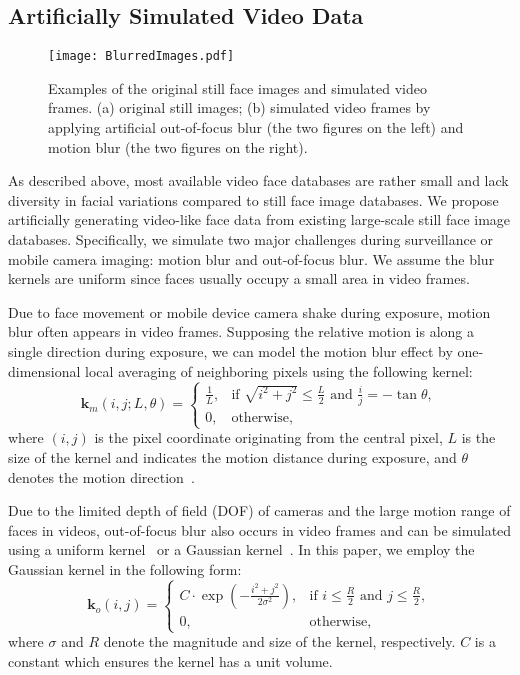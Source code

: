 \documentclass[10pt,journal,cspaper,compsoc]{IEEEtran}
\begin{document}
\subsection{Artificially Simulated Video Data}
\begin{figure}
\centering
\texttt{[image: BlurredImages.pdf]}
\caption{Examples of the original still face images and simulated video frames. (a) original still images;
(b) simulated video frames by applying artificial out-of-focus blur (the two figures on the left) and motion blur (the two figures on the right).}
\label{fig:BlurredImages}
\end{figure}

As described above, most available video face databases are rather small and lack diversity in facial variations compared to still face image databases.
We propose artificially generating video-like face data from existing large-scale still face image databases.
Specifically, we simulate two major challenges during surveillance or mobile camera imaging: motion blur and out-of-focus blur.
We assume the blur kernels are uniform since faces usually occupy a small area in video frames.

Due to face movement or mobile device camera shake during exposure, motion blur often appears in video frames.
Supposing the relative motion is along a single direction during exposure,
we can model the motion blur effect by one-dimensional local averaging of neighboring pixels using the following kernel:
\begin{equation}
\label{E:linearmotion}
\mathbf{k}_{m}(i,j;L,\theta)=
\begin{cases}
\frac{1}{L}, &\text{if } \sqrt{i^2+j^2}\leq\frac{L}{2} \text{ and } \frac{i}{j}=-\tan\theta,\\
0, &\text{otherwise},
\end{cases}
\end{equation}
where $(i,j)$ is the pixel coordinate originating from the central pixel,
$L$ is the size of the kernel and indicates the motion distance during exposure, and $\theta$ denotes the motion direction~\cite{wang2014recent}.

Due to the limited depth of field (DOF) of cameras and the large motion range of faces in videos,
out-of-focus blur also occurs in video frames and can be simulated using a uniform kernel~\cite{wang2014recent} or a Gaussian kernel~\cite{nishiyama2011facial}.
In this paper, we employ the Gaussian kernel in the following form:
\begin{equation}
\label{E:outoffocus}
\mathbf{k}_{o}(i,j)=
\begin{cases}
C\cdot\exp\left(-\frac{i^2+j^2}{2\sigma^2}\right),& \text{if }{i}\leq\frac{R}{2} \text{ and } {j}\leq\frac{R}{2},\\
0, & \text{otherwise},
\end{cases}
\end{equation}
where $\sigma$ and $R$ denote the magnitude and size of the kernel, respectively.
$C$ is a constant which ensures the kernel has a unit volume.
\end{document}
